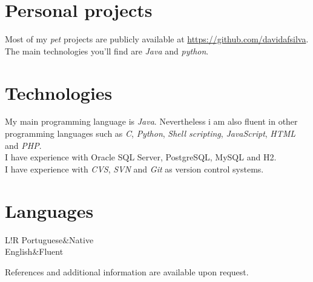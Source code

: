 \documentclass[10pt]{article}
\newcommand\VRule{\color{lightgray}\vrule width 0.5pt}
\begin{document}
\section*{Personal projects}
Most of my \emph{pet} projects are publicly available at \url{https://github.com/davidafsilva}.
The main technologies you'll find are \emph{Java} and \emph{python}.

\section*{Technologies}
My main programming language is \emph{Java}. Nevertheless i am also fluent in other programming languages such as \emph{C}, \emph{Python}, \emph{Shell scripting}, \emph{JavaScript}, \emph{HTML} and \emph{PHP}.\\
I have experience with Oracle SQL Server, PostgreSQL, MySQL and H2.\\
I have experience with \emph{CVS}, \emph{SVN} and \emph{Git} as version control systems.

\section*{Languages}
\begin{tabular}{L!{\VRule}R}
Portuguese&Native\\
English&Fluent\\
\end{tabular}
{\vspace{20pt}\newline\newline
\vspace{20pt}
\scriptsize\hfill References and additional information are available upon request.}
\end{document}

